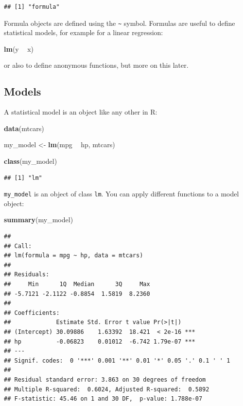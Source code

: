 \documentclass[]{gitbook}
\newenvironment{Shaded}{\begin{snugshade}}{\end{snugshade}}
\newcommand{\KeywordTok}[1]{\textcolor[rgb]{0.13,0.29,0.53}{\textbf{#1}}}
\newcommand{\NormalTok}[1]{#1}
\newcommand{\OperatorTok}[1]{\textcolor[rgb]{0.81,0.36,0.00}{\textbf{#1}}}
\newcommand{\StringTok}[1]{\textcolor[rgb]{0.31,0.60,0.02}{#1}}
\begin{document}
\begin{verbatim}
## [1] "formula"
\end{verbatim}

Formula objects are defined using the \texttt{\textasciitilde{}} symbol. Formulas are useful to define statistical models,
for example for a linear regression:

\begin{Shaded}
\begin{Highlighting}[]
\KeywordTok{lm}\NormalTok{(y }\OperatorTok{~}\StringTok{ }\NormalTok{x)}
\end{Highlighting}
\end{Shaded}

or also to define anonymous functions, but more on this later.

\hypertarget{models}{%
\subsection{Models}\label{models}}

A statistical model is an object like any other in R:

\begin{Shaded}
\begin{Highlighting}[]
\KeywordTok{data}\NormalTok{(mtcars)}

\NormalTok{my_model <-}\StringTok{ }\KeywordTok{lm}\NormalTok{(mpg }\OperatorTok{~}\StringTok{ }\NormalTok{hp, mtcars)}

\KeywordTok{class}\NormalTok{(my_model)}
\end{Highlighting}
\end{Shaded}

\begin{verbatim}
## [1] "lm"
\end{verbatim}

\texttt{my\_model} is an object of class \texttt{lm}. You can apply different functions to a model object:

\begin{Shaded}
\begin{Highlighting}[]
\KeywordTok{summary}\NormalTok{(my_model)}
\end{Highlighting}
\end{Shaded}

\begin{verbatim}
## 
## Call:
## lm(formula = mpg ~ hp, data = mtcars)
## 
## Residuals:
##     Min      1Q  Median      3Q     Max 
## -5.7121 -2.1122 -0.8854  1.5819  8.2360 
## 
## Coefficients:
##             Estimate Std. Error t value Pr(>|t|)    
## (Intercept) 30.09886    1.63392  18.421  < 2e-16 ***
## hp          -0.06823    0.01012  -6.742 1.79e-07 ***
## ---
## Signif. codes:  0 '***' 0.001 '**' 0.01 '*' 0.05 '.' 0.1 ' ' 1
## 
## Residual standard error: 3.863 on 30 degrees of freedom
## Multiple R-squared:  0.6024, Adjusted R-squared:  0.5892 
## F-statistic: 45.46 on 1 and 30 DF,  p-value: 1.788e-07
\end{verbatim}
\end{document}
